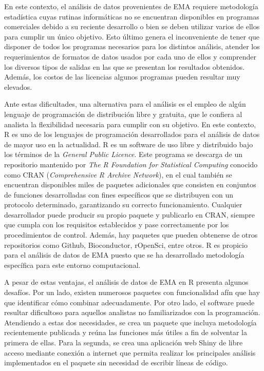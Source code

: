 En este contexto, el análisis de datos provenientes de EMA requiere metodología estadística cuyas rutinas informáticas no se encuentran disponibles en programas comerciales debido a su reciente desarrollo o bien se deben utilizar varios de ellos para cumplir un único objetivo. Esto último genera el inconveniente de tener que disponer de todos los programas necesarios para los distintos análisis, atender los requerimientos de formatos de datos usados por cada uno de ellos y comprender los diversos tipos de salidas en las que se presentan los resultados obtenidos. Además, los costos de las licencias algunos programas pueden resultar muy elevados. 

Ante estas dificultades, una alternativa para el análisis es el empleo de algún lenguaje de programación de distribución libre y gratuita, que le confiera al analista la flexibilidad necesaria para cumplir con su objetivo. En este contexto, R es uno de los lenguajes de programación desarrollados para el análisis de datos de mayor uso en la actualidad. R es un software de uso libre y distribuido bajo los términos de la \emph{General Public Licence}. Este programa se descarga de un repositorio mantenido por \emph{The R Foundation for Statistical Computing} conocido como CRAN (\emph{Comprehensive R Archive Network}), en el cual también se encuentran disponibles miles de paquetes adicionales que consisten en conjuntos de funciones desarrolladas con fines específicos que se distribuyen con un protocolo determinado, garantizando su correcto funcionamiento. Cualquier desarrollador puede producir su propio paquete y publicarlo en CRAN, siempre que cumpla con los requisitos establecidos y pase correctamente por los procedimientos de control. Además, hay paquetes que pueden obtenerse de otros repositorios como Github, Bioconductor, rOpenSci, entre otros. R es propicio para el análisis de datos de EMA puesto que se ha desarrollado metodología específica para este entorno computacional. 

A pesar de estas ventajas, el análisis de datos de EMA en R presenta algunos desafíos. Por un lado, existen numerosos paquetes con funcionalidad afín que hay que identificar cómo combinar adecuadamente. Por otro lado, el software puede resultar dificultoso para aquellos analistas no familiarizados con la programación. Atendiendo a estas dos necesidades, se crea un paquete que incluya metodología recientemente publicada y reúna las funciones más útiles a fin de solventar la primera de ellas. Para la segunda, se crea una aplicación web Shiny de libre acceso mediante conexión a internet que permita realizar los principales análisis implementados en el paquete sin necesidad de escribir líneas de código. 
